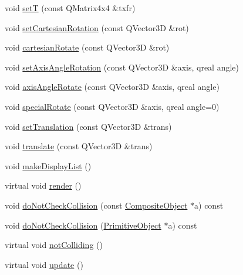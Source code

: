 \begin{DoxyCompactItemize}
\item 
void \hyperlink{class_robot_model_1_1_composite_object_abd48ac40b21178f5306ddfa6c92ea3c3}{setT} (const QMatrix4x4 \&txfr)
\item 
void \hyperlink{class_robot_model_1_1_composite_object_a12e8961ebc63d8a253d915b29b356162}{setCartesianRotation} (const QVector3D \&rot)
\item 
void \hyperlink{class_robot_model_1_1_composite_object_adadc29cccbba9cb615eaf0ad2fbdd337}{cartesianRotate} (const QVector3D \&rot)
\item 
void \hyperlink{class_robot_model_1_1_composite_object_a43f99ed52def7114d310e29fc6db83f3}{setAxisAngleRotation} (const QVector3D \&axis, qreal angle)
\item 
void \hyperlink{class_robot_model_1_1_composite_object_a357f5ed3f49e0889df511271e468f866}{axisAngleRotate} (const QVector3D \&axis, qreal angle)
\item 
void \hyperlink{class_robot_model_1_1_composite_object_ad44b9c1759209367754dafd77c984d6f}{specialRotate} (const QVector3D \&axis, qreal angle=0)
\item 
void \hyperlink{class_robot_model_1_1_composite_object_ae925e59246174c9d3b74d459b32835e3}{setTranslation} (const QVector3D \&trans)
\item 
void \hyperlink{class_robot_model_1_1_composite_object_afd942b7fa3b18bcc01c3fba417a6c027}{translate} (const QVector3D \&trans)
\item 
void \hyperlink{class_robot_model_1_1_composite_object_a5aa475cb09f0e9b9089a941848f9e189}{makeDisplayList} ()
\item 
virtual void \hyperlink{class_robot_model_1_1_composite_object_aee43da74b22f6272736844effe7a1dd6}{render} ()
\item 
void \hyperlink{class_robot_model_1_1_composite_object_ab6dc53258a7cdb53a22af63688d50ddd}{doNotCheckCollision} (const \hyperlink{class_robot_model_1_1_composite_object}{CompositeObject} $\ast$a) const 
\item 
void \hyperlink{class_robot_model_1_1_composite_object_a788711732ec5994c3f3a09321e2c5a18}{doNotCheckCollision} (\hyperlink{class_robot_model_1_1_primitive_object}{PrimitiveObject} $\ast$a) const 
\item 
virtual void \hyperlink{class_robot_model_1_1_composite_object_a00db0d1a45893ef058e7abbad5083b6b}{notColliding} ()
\item 
virtual void \hyperlink{class_robot_model_1_1_composite_object_aacfefeee128f748e4e705708b9d958e3}{update} ()
\item 

\end{DoxyCompactItemize}
